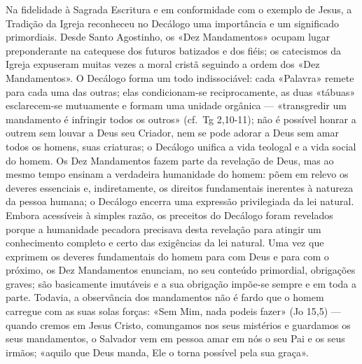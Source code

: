 Na fidelidade à Sagrada Escritura e em conformidade com o exemplo de Jesus, a Tradição da Igreja reconheceu no Decálogo uma importância e um significado primordiais. Desde Santo Agostinho, os «Dez Mandamentos» ocupam lugar preponderante na catequese dos futuros batizados e dos fiéis; os catecismos da Igreja expuseram muitas vezes a moral cristã seguindo a ordem dos «Dez Mandamentos». O Decálogo forma um todo indissociável: cada «Palavra» remete para cada uma das outras; elas condicionam-se reciprocamente, as duas «tábuas» esclarecem-se mutuamente e formam uma unidade orgânica --- «transgredir um mandamento é infringir todos os outros» (cf.~Tg 2,10-11); não é possível honrar a outrem sem louvar a Deus seu Criador, nem se pode adorar a Deus sem amar todos os homens, suas criaturas; o Decálogo unifica a vida teologal e a vida social do homem. Os Dez Mandamentos fazem parte da revelação de Deus, mas ao mesmo tempo ensinam a verdadeira humanidade do homem: põem em relevo os deveres essenciais e, indiretamente, os direitos fundamentais inerentes à natureza da pessoa humana; o Decálogo encerra uma expressão privilegiada da lei natural. Embora acessíveis à simples razão, os preceitos do Decálogo foram revelados porque a humanidade pecadora precisava desta revelação para atingir um conhecimento completo e certo das exigências da lei natural. Uma vez que exprimem os deveres fundamentais do homem para com Deus e para com o próximo, os Dez Mandamentos enunciam, no seu conteúdo primordial, obrigações graves; são basicamente imutáveis e a sua obrigação impõe-se sempre e em toda a parte. Todavia, a observância dos mandamentos não é fardo que o homem carregue com as suas solas forças: «Sem Mim, nada podeis fazer» (Jo 15,5) --- quando cremos em Jesus Cristo, comungamos nos seus mistérios e guardamos os seus mandamentos, o Salvador vem em pessoa amar em nós o seu Pai e os seus irmãos; «aquilo que Deus manda, Ele o torna possível pela sua graça».
